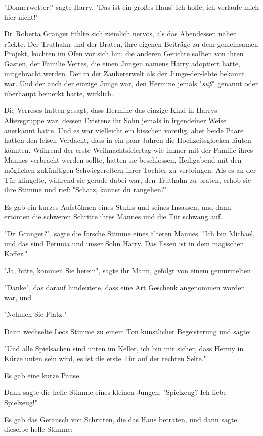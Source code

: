 {"Donnerwetter!" sagte Harry. "Das ist ein großes Haus! Ich hoffe, ich verlaufe mich hier nicht!"

Dr~Roberta Granger fühlte sich ziemlich nervös, als das Abendessen näher rückte. Der Truthahn und der Braten, ihre eigenen Beiträge zu dem gemeinsamen Projekt, kochten im Ofen vor sich hin; die anderen Gerichte sollten von ihren Gästen, der Familie Verres, die einen Jungen namens Harry adoptiert hatte, mitgebracht werden. Der in der Zaubererwelt als der Junge-der-lebte bekannt war. Und der auch der einzige Junge war, den Hermine jemals "\emph{süß}" genannt oder überhaupt bemerkt hatte, wirklich.

Die Verreses hatten gesagt, dass Hermine das einzige Kind in Harrys Altersgruppe war, dessen Existenz ihr Sohn jemals in irgendeiner Weise anerkannt hatte. Und es war vielleicht ein bisschen voreilig, aber beide Paare hatten den leisen Verdacht, dass in ein paar Jahren die Hochzeitsglocken läuten könnten. Während der erste Weihnachtsfeiertag wie immer mit der Familie ihres Mannes verbracht werden sollte, hatten sie beschlossen, Heiligabend mit den möglichen zukünftigen Schwiegereltern ihrer Tochter zu verbringen. Als es an der Tür klingelte, während sie gerade dabei war, den Truthahn zu braten, erhob sie ihre Stimme und rief: "Schatz, kannst du rangehen?".

Es gab ein kurzes Aufstöhnen eines Stuhls und seines Insassen, und dann ertönten die schweren Schritte ihres Mannes und die Tür schwang auf.

"Dr~Granger?", sagte die forsche Stimme eines älteren Mannes. "Ich bin Michael, und das sind Petunia und unser Sohn Harry. Das Essen ist in dem magischen Koffer."

"Ja, bitte, kommen Sie herein", sagte ihr Mann, gefolgt von einem gemurmelten

"Danke", das darauf hindeutete, dass eine Art Geschenk angenommen worden war, und

"Nehmen Sie Platz."

Dann wechselte Leos Stimme zu einem Ton künstlicher Begeisterung und sagte:

"Und alle Spielsachen sind unten im Keller, ich bin mir sicher, dass Hermy in Kürze unten sein wird, es ist die erste Tür auf der rechten Seite."

Es gab eine kurze Pause.

Dann sagte die helle Stimme eines kleinen Jungen: "Spielzeug? Ich liebe Spielzeug!"

Es gab das Geräusch von Schritten, die das Haus betraten, und dann sagte dieselbe helle Stimme:

}
